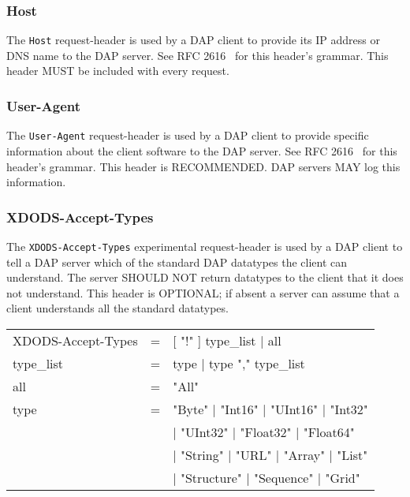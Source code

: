 \documentclass{article}
\begin{document}
\subsubsection{Host}
\label{sec:host}
The \texttt{Host} request-header is used by a \ac{DAP} client to provide its
IP address or DNS name to the \ac{DAP} server. See RFC 2616~\cite{rfc2616}
for this header's grammar. This header MUST be included with every request.

\subsubsection{User-Agent}
\label{sec:user-agent}
The \texttt{User-Agent} request-header is used by a \ac{DAP} client to
provide specific information about the client software to the \ac{DAP}
server. See RFC 2616~\cite{rfc2616} for this header's grammar. This header is
RECOMMENDED. \ac{DAP} servers MAY log this information.

\subsubsection{XDODS-Accept-Types}
\label{sec:accept-types}
The \texttt{XDODS-Accept-Types} experimental request-header is used by a
\ac{DAP} client to tell a \ac{DAP} server which of the standard \ac{DAP}
datatypes the client can understand. The server SHOULD NOT return datatypes
to the client that it does not understand. This header is OPTIONAL; if absent
a server can assume that a client understands all the standard datatypes. 

\begin{ttfamily}
\begin{center}
\begin{tabular}{lll}
XDODS-Accept-Types & = & [ "!" ] type\_list | all \\
type\_list & = & type | type "," type\_list \\
all & = & "All" \\
type & = & "Byte" | "Int16" | "UInt16" | "Int32" \\
       & & | "UInt32" | "Float32" | "Float64" \\
       & & | "String" | "URL" | "Array" | "List" \\ 
       & & | "Structure" | "Sequence" | "Grid" \\
\end{tabular}
\end{center}
\end{ttfamily}
\end{document}
